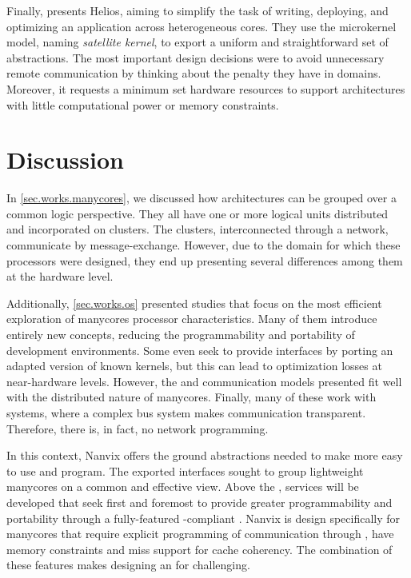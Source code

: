 	Finally,  presents  Helios, aiming to
	simplify the task of writing, deploying, and optimizing an application across
	heterogeneous cores.
	They use the microkernel model, naming \textit{satellite kernel}, to export
	a uniform and straightforward set of \os abstractions.
	The most important design decisions were to avoid unnecessary remote communication
	by thinking about the penalty they have in \numa domains.
	Moreover, it requests a minimum set hardware resources to support architectures with little
	computational power or memory constraints.

\section{Discussion}

	In \autoref{sec.works.manycores}, we discussed how \manycore architectures can be
	grouped over a common logic perspective.
	They all have one or more logical units distributed and incorporated on clusters.
	The clusters, interconnected through a network, communicate by message-exchange.
	However, due to the domain for which these processors were designed, they end up
	presenting several differences among them at the hardware level.

	Additionally, \autoref{sec.works.os} presented \oss studies that focus
	on the most efficient exploration of manycores processor characteristics.
	Many of them introduce entirely new concepts, reducing the programmability
	and portability of development environments. Some even seek to provide
	\posix interfaces by porting an adapted version of known kernels, but
	this can lead to optimization losses at near-hardware levels.
	However, the \os and communication models presented fit well with the
	distributed nature of manycores.
	Finally, many of these \oss work with \numa systems,
	where a complex bus system makes communication transparent. Therefore, there
	is, in fact, no network programming. 

	In this context, Nanvix \hal offers the ground \os abstractions needed to make
	\lightweight \manycores more easy to use and program.
	The exported interfaces sought to group lightweight manycores on a common and effective view.
	Above the \hal, services will be developed that seek first and foremost
	to provide greater programmability and portability through a fully-featured
	\posix-compliant \os. Nanvix \os is design specifically for manycores that require
	explicit programming of communication through \noc, have
	memory constraints and miss support for cache coherency. The combination of these
	features makes designing an \os for \lightweight \manycores challenging.